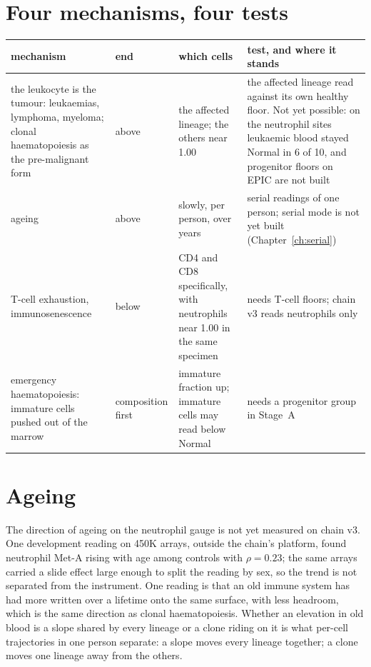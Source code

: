 

\section{Four mechanisms, four tests}

\begin{center}\small
\begin{longtable}{@{}p{}p{}p{}p{}@{}}
\toprule mechanism & end & which cells & test, and where it stands \\\midrule\endhead
the leukocyte is the tumour: leukaemias, lymphoma, myeloma; clonal haematopoiesis as the pre-malignant form & above & the affected lineage; the others near 1.00 & the affected lineage read against its own healthy floor. Not yet possible: on the neutrophil sites leukaemic blood stayed Normal in 6 of 10, and progenitor floors on EPIC are not built \\
ageing & above & slowly, per person, over years & serial readings of one person; serial mode is not yet built (Chapter~\ref{ch:serial}) \\
T-cell exhaustion, immunosenescence & below & CD4 and CD8 specifically, with neutrophils near 1.00 in the same specimen & needs T-cell floors; chain v3 reads neutrophils only \\
emergency haematopoiesis: immature cells pushed out of the marrow & composition first & immature fraction up; immature cells may read below Normal & needs a progenitor group in Stage~A \\\bottomrule
\end{longtable}
\end{center}

\section{Ageing}

The direction of ageing on the neutrophil gauge is not yet measured on chain v3. \openprob{} One development reading on 450K arrays, outside the chain's platform, found
neutrophil Met-A rising with age among controls with $\rho=0.23$; the same arrays carried a slide effect large
enough to split the reading by sex, so the trend is not separated from the instrument. \observed{} One reading is that an old immune system has had more written
over a lifetime onto the same surface, with less headroom, which is the same direction as clonal haematopoiesis. \conjecture{} Whether an elevation in old blood is a slope
shared by every lineage or a clone riding on it is what per-cell trajectories in one person separate: a slope moves every lineage together; a clone moves one lineage away from
the others.

